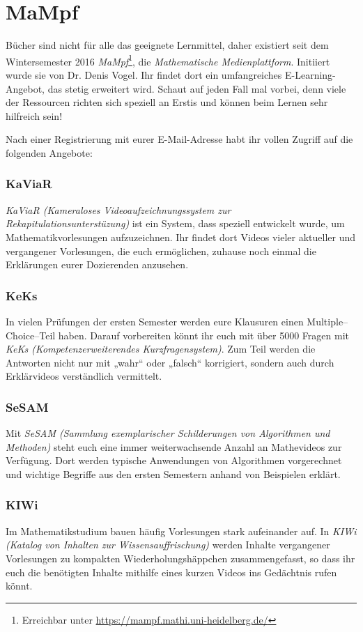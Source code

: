 \section{MaMpf}
\label{mampf}

Bücher sind nicht für alle das geeignete Lernmittel, daher existiert seit dem Wintersemester 2016 \emph{MaMpf}\footnote{Erreichbar unter \url{https://mampf.mathi.uni-heidelberg.de/}}, die \emph{Mathematische Medienplattform}. Initiiert wurde sie von Dr. Denis Vogel. Ihr findet dort ein umfangreiches E-Learning-Angebot, das stetig erweitert wird. Schaut auf jeden Fall mal vorbei, denn viele der Ressourcen richten sich speziell an Erstis und können beim Lernen sehr hilfreich sein!

Nach einer Registrierung mit eurer E-Mail-Adresse habt ihr vollen Zugriff auf die folgenden Angebote:

\subsubsection{KaViaR}
\emph{KaViaR (Kameraloses Videoaufzeichnungssystem zur Rekapitulationsunterstüzung)} ist ein System, dass speziell entwickelt wurde, um Mathematikvorlesungen aufzuzeichnen. Ihr findet dort Videos vieler aktueller und vergangener Vorlesungen, die euch ermöglichen, zuhause noch einmal die Erklärungen eurer Dozierenden anzusehen.

\subsubsection{KeKs}
In vielen Prüfungen der ersten Semester werden eure Klausuren einen Multiple--Choice--Teil haben. Darauf vorbereiten könnt ihr euch mit über 5000 Fragen mit \emph{KeKs (Kompetenzerweiterendes Kurzfragensystem)}. Zum Teil werden die Antworten nicht nur mit „wahr“ oder „falsch“ korrigiert, sondern auch durch Erklärvideos verständlich vermittelt.

\subsubsection{SeSAM}
Mit \emph{SeSAM (Sammlung exemplarischer Schilderungen von Algorithmen und Methoden)} steht euch eine immer weiterwachsende Anzahl an Mathevideos zur Verfügung. Dort werden typische Anwendungen von Algorithmen vorgerechnet und wichtige Begriffe aus den ersten Semestern anhand von Beispielen erklärt. 

\subsubsection{KIWi}
Im Mathematikstudium bauen häufig Vorlesungen stark aufeinander auf. In \emph{KIWi (Katalog von Inhalten zur Wissensauffrischung)} werden Inhalte vergangener Vorlesungen zu kompakten Wiederholungshäppchen zusammengefasst, so dass ihr euch die benötigten Inhalte mithilfe eines kurzen Videos ins Gedächtnis rufen könnt.


